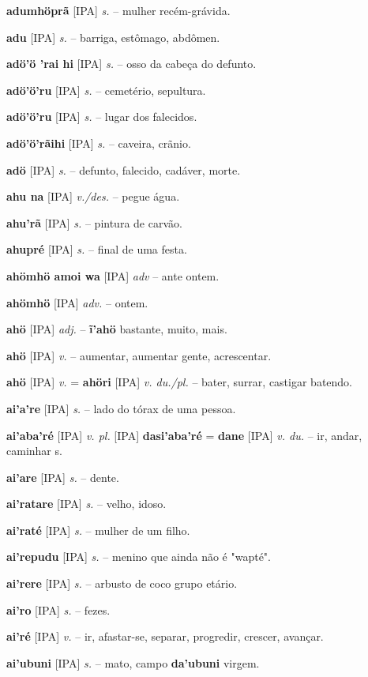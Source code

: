 \textbf{adumhöprã} [IPA] \textit{s.} -- mulher recém-grávida.

\textbf{adu} [IPA] \textit{s.} -- barriga, estômago, abdômen.

\textbf{adö'ö 'rai hi} [IPA] \textit{s.} -- osso da cabeça do defunto.

\textbf{adö'ö'ru} [IPA] \textit{s.} -- cemetério, sepultura.

\textbf{adö'ö'ru} [IPA] \textit{s.} -- lugar dos falecidos.

\textbf{adö'ö'rãihi} [IPA] \textit{s.} -- caveira, crãnio.

\textbf{adö} [IPA] \textit{s.} -- defunto, falecido, cadáver, morte.

\textbf{ahu na} [IPA] \textit{v./des.} -- pegue água.

\textbf{ahu'rã} [IPA] \textit{s.} -- pintura de carvão.

\textbf{ahupré} [IPA] \textit{s.} -- final de uma festa.

\textbf{ahömhö amoi wa} [IPA] \textit{adv} -- ante ontem.

\textbf{ahömhö} [IPA] \textit{adv.} -- ontem.

\textbf{ahö} [IPA] \textit{adj.} -- \textbf{ĩ'ahö} bastante, muito, mais.

\textbf{ahö} [IPA] \textit{v.} -- aumentar, aumentar gente, acrescentar.

\textbf{ahö} [IPA] \textit{v.} = \textbf{ahöri} [IPA] \textit{v. du./pl.} -- bater, surrar, castigar batendo.

\textbf{ai'a're} [IPA] \textit{s.} -- lado do tórax de uma pessoa.

\textbf{ai'aba'ré} [IPA] \textit{v. pl.} [IPA] \textbf{dasi'aba'ré} = \textbf{dane} [IPA] \textit{v. du.} -- ir, andar, caminhar s.

\textbf{ai'are} [IPA] \textit{ s.} -- dente.

\textbf{ai'ratare} [IPA] \textit{s.} -- velho, idoso.

\textbf{ai'raté} [IPA] \textit{s.} -- mulher de um filho.

\textbf{ai'repudu} [IPA] \textit{s.} -- menino que ainda não é "wapté".

\textbf{ai'rere} [IPA] \textit{s.} -- arbusto de coco  grupo etário.

\textbf{ai'ro} [IPA] \textit{s.} -- fezes.

\textbf{ai'ré} [IPA] \textit{v.} -- ir, afastar-se, separar, progredir, crescer, avançar.

\textbf{ai'ubuni} [IPA] \textit{s.} -- mato, campo  \textbf{da'ubuni} virgem.

